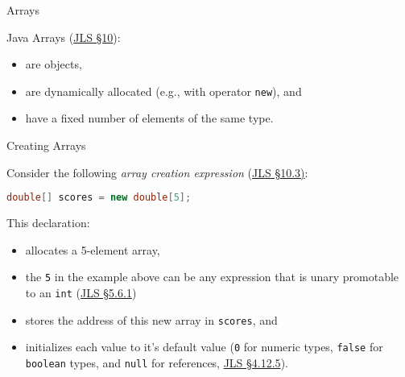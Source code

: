 \documentclass{beamer}
\begin{document}
\begin{frame}
  \titlepage
\end{frame}


\begin{frame}[fragile]{Arrays}


Java Arrays (\href{http://docs.oracle.com/javase/specs/jls/se8/html/jls-10.html}{JLS \S 10}):
\begin{itemize}
\item are objects,
\item are dynamically allocated (e.g., with operator {\tt new}), and
\item have a fixed number of elements of the same type.
\end{itemize}



\end{frame}

\begin{frame}[fragile]{Creating Arrays}


Consider the following {\it array creation expression} (\href{http://docs.oracle.com/javase/specs/jls/se8/html/jls-10.html#jls-10.3}{JLS \S 10.3)}:
\begin{lstlisting}[language=Java]
double[] scores = new double[5];
\end{lstlisting}
This declaration:
\begin{itemize}
\item allocates a 5-element array,
\item the {\tt 5} in the example above can be any expression that is unary promotable to an {\tt int} (\href{http://docs.oracle.com/javase/specs/jls/se7/html/jls-5.html#jls-5.6.1}{JLS \S 5.6.1})
\item stores the address of this new array in {\tt scores}, and
\item initializes each value to it's default value ({\tt 0} for numeric types, {\tt false} for {\tt boolean} types, and {\tt null} for references, \href{http://docs.oracle.com/javase/specs/jls/se8/html/jls-4.html#jls-4.12.5}{JLS \S 4.12.5}).
\end{itemize}


\end{frame}
\end{document}
